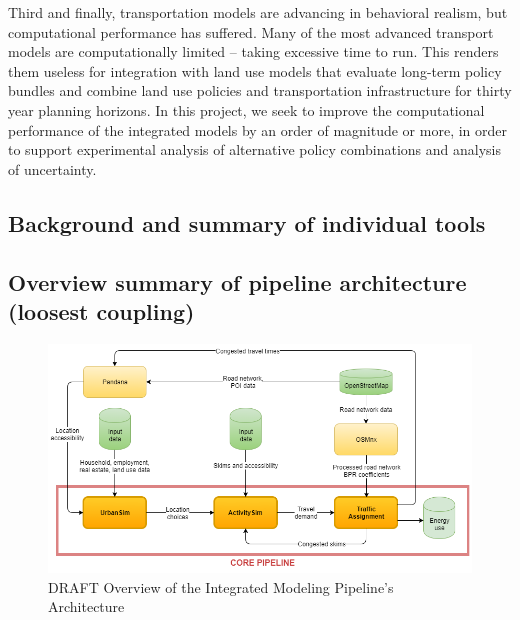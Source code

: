 Third and finally, transportation models are advancing in behavioral realism, but computational performance has suffered. Many of the most advanced transport models are computationally limited – taking excessive time to run. This renders them useless for integration with land use models that evaluate long-term policy bundles and combine land use policies and transportation infrastructure for thirty year planning horizons. 
In this project, we seek to improve the computational performance of the integrated models by an order of magnitude or more, in order to support experimental analysis of alternative policy combinations and analysis of uncertainty.


\subsection{Background and summary of individual tools}

\subsection{Overview summary of pipeline architecture (loosest coupling)}

\begin{figure}[htb]
\center
\includegraphics[width=6.5in]
{graphics/diagram_pipeline.png}
\caption{DRAFT Overview of the Integrated Modeling Pipeline's Architecture}
\label{fig:overview_pipeline_architecture}
\end{figure}




